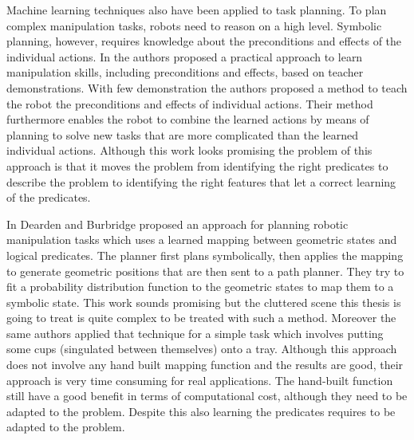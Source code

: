 Machine learning techniques also have been applied to task planning. To plan complex manipulation tasks,
robots need to reason on a high level. Symbolic planning, however, requires knowledge about the preconditions and effects
of the individual actions. 
In \citep{abdo2013learning} the authors proposed a practical
approach to learn manipulation skills, including preconditions
and effects, based on teacher demonstrations.
With few demonstration the authors proposed a method to teach the robot the preconditions and effects of individual actions. Their method furthermore enables the robot to combine the learned actions by means of planning to solve new tasks that are more complicated than the learned individual actions. 
Although this work looks promising the problem of this approach is that it moves the problem from identifying the right predicates to describe the problem to identifying the right features that let a correct learning of the predicates. 

In \citep{Dearden2014355} Dearden and Burbridge proposed an approach for planning robotic manipulation tasks which uses a learned mapping between geometric states and logical predicates. The planner first plans symbolically, then applies the mapping to generate geometric positions that are then sent to a path planner. They try to fit a probability distribution function to the geometric states to map them to a symbolic state. This work sounds promising but the cluttered scene this thesis is going to treat is quite complex to be treated with such a method. Moreover the same authors applied that technique \citep{dearden2013approach} for a simple task which involves putting some cups (singulated between themselves) onto a tray. Although this approach does not involve any hand built mapping function and the results are good, their approach is very time consuming for real applications. The hand-built function still have a good benefit in terms of computational cost, although they need to be adapted to the problem. Despite this also learning the predicates requires to be adapted to the problem. 


